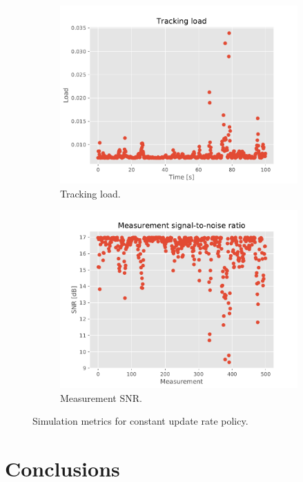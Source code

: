\documentclass[english, 12pt, a4paper, elec, utf8, a-1b, online]{aaltothesis}
\begin{document}
\begin{figure}
    \hfill
    \begin{subfigure}[b]{0.45\textwidth}
            \centering
            \includegraphics[width=\textwidth]{figures/simulations/load.pdf}
            \caption{Tracking load.}
            \label{fig:sim_load}
     \end{subfigure}
    \hfill
    \begin{subfigure}[b]{0.45\textwidth}
        \centering
        \includegraphics[width=\textwidth]{figures/simulations/snr.pdf}
        \caption{Measurement SNR.}
        \label{fig:sim_snr}
    \end{subfigure}
     
    \caption{Simulation metrics for constant update rate policy.}
    \label{fig:three graphs}
\end{figure}

\newpage
\section{Conclusions}


\thesisbibliography

\printbibliography
\end{document}
